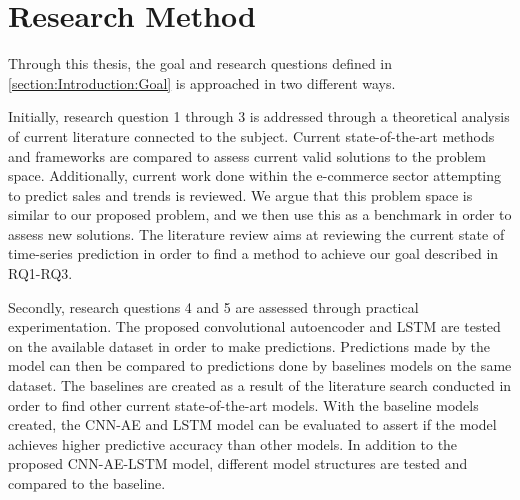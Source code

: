 \section{Research Method}
\label{section:Introduction:research-method}

Through this thesis, the goal and research questions defined in \autoref{section:Introduction:Goal} is approached in two different ways.

Initially, research question 1 through 3 is addressed through a theoretical analysis of current literature connected to the subject.
Current state-of-the-art methods and frameworks are compared to assess current valid solutions to the problem space.
Additionally, current work done within the e-commerce sector attempting to predict sales and trends is reviewed.
We argue that this problem space is similar to our proposed problem, and we then use this as a benchmark in order to assess new solutions.
The literature review aims at reviewing the current state of time-series prediction in order to find a method to achieve our goal described in RQ1-RQ3.

Secondly, research questions 4 and 5 are assessed through practical experimentation.
The proposed convolutional autoencoder and LSTM are tested on the available dataset in order to make predictions.
Predictions made by the model can then be compared to predictions done by baselines models on the same dataset.
The baselines are created as a result of the literature search conducted in order to find other current state-of-the-art models.
With the baseline models created, the CNN-AE and LSTM model can be evaluated to assert if the model achieves higher predictive accuracy than other models.
In addition to the proposed CNN-AE-LSTM model,
different model structures are tested and compared to the baseline.



\iffalse
  This thesis approaches the goal and research questions through theoretical analysis
  of the problem space.
  Primarily the focus of this thesis is to conduct a review and analysis of current literature.
  Reviewing the current state-of-the-art methods for predictive analysis of time-series,
  as well as new experimental methods and frameworks.
  Additionally, we review the current work done within the E-commerce sector attempting to predict sales and trends.
  We argue that this problem space is similar to our proposed problem, and we thus use this as a benchmark in order to assess new solutions.
  The literature review aims at reviewing the current state of time-series prediction,
  in order to best find a method to achieve our goal described above.
\fi


